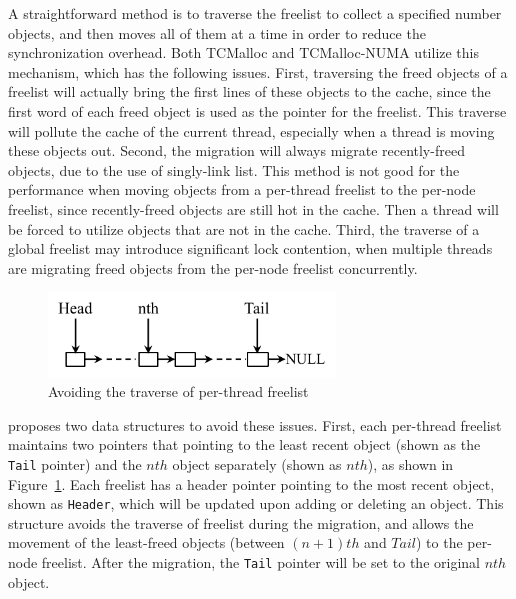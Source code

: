 A straightforward method is to traverse the freelist to collect a specified number objects, and then moves all of them at a time in order to reduce the synchronization overhead. Both TCMalloc and TCMalloc-NUMA utilize this mechanism, which has the following issues. First, traversing the freed objects of a freelist will actually bring the first lines of these objects to the cache, since the first word of each freed object is used as the pointer for the freelist. This traverse will pollute the cache of the current thread, especially when a thread is moving these objects out. 
Second, the migration will always migrate recently-freed objects, due to the use of singly-link list. This method is not good for the performance when moving objects from a per-thread freelist to the per-node freelist, since recently-freed objects are still hot in the cache. Then a thread will be forced to utilize objects that are not in the cache. 
Third, the traverse of a global freelist may introduce significant lock contention, when multiple threads are migrating freed objects from the per-node freelist concurrently.

\begin{figure}[!h]
\centering
\includegraphics[width=3in]{figure/perthreadlist}
\caption{Avoiding the traverse of per-thread freelist\label{fig:perthreadlist}}
\end{figure}

\NM{} proposes two data structures to avoid these issues. First, each per-thread freelist maintains two pointers that pointing to the least recent object (shown as the \texttt{Tail} pointer) and the $nth$ object separately (shown as $nth$), as shown in Figure~\ref{fig:perthreadlist}. Each freelist has a header pointer pointing to the most recent object, shown as \texttt{Header}, which will be updated upon adding or deleting an object. This structure avoids the traverse of freelist during the migration, and allows the movement of the least-freed objects (between $(n+1)th$ and $Tail$) to the per-node freelist. After the migration, the \texttt{Tail} pointer will be set to the original $nth$ object. 

